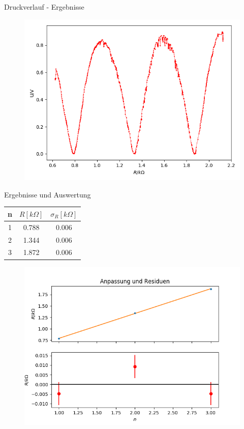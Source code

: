 \documentclass[14pt]{beamer}
\begin{document}
\begin{frame}{Druckverlauf - Ergebnisse}
\begin{figure}
\includegraphics[scale=0.5]{druckverlauf}
\end{figure}
\end{frame}

\begin{frame}{Ergebnisse und Auswertung}
\begin{table}
\begin{tabular}{|c|c|c|}
\hline 
n & $R[k\Omega]$ & $\sigma_R[k\Omega]$ \\ 
\hline 
1 & 0.788 & 0.006 \\ 
\hline 
2 & 1.344 & 0.006 \\ 
\hline 
3 & 1.872 & 0.006 \\ 
\hline 
\end{tabular} 
\end{table}

\begin{figure}
\includegraphics[scale=0.37]{fitdruckknoten}
\end{figure}
\end{frame}
\end{document}
